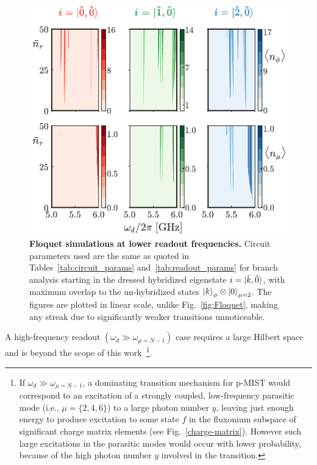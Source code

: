 \documentclass[%
reprint,
superscriptaddress,
 amsmath,amssymb,
 aps,
 prx,
longbibliography,
floatfix,
]{revtex4-2}
\newcommand{\AC}[1]{{\color{blue}{{}[AC: #1]}}}
\begin{document}
\begin{figure}[t]
    \centering
    \includegraphics[width=\linewidth]{Figures/Floquet_low.pdf}
    \caption{{\bf Floquet simulations at lower readout frequencies.} Circuit parameters used are the same as quoted in Tables~\ref{tab:circuit_params} and~\ref{tab:readout_params} for branch analysis starting in the dressed hybridized eigenstate $i=\ket{\tilde{k},\tilde{0}}$, with maximum overlap to the un-hybridized states $\ket{k}_\phi\otimes\ket{0}_{\mu=2}$. The figures are plotted in linear scale, unlike Fig.~\ref{fig:Floquet}, making any streak due to significantly weaker transitions unnoticeable.}
    \label{fig:Flo_low}
\end{figure}

A high-frequency readout $(\omega_d\gg \omega_{\mu=N-1})$ case requires a large Hilbert space and is beyond the scope of this work~\footnote{If  $\omega_d\gg \omega_{\mu=N-1}$, a dominating transition mechanism for p-MIST would correspond to an excitation of a strongly coupled, low-frequency parasitic mode (i.e., $\mu=\{2,4,6\}$) to a large photon number $y$, leaving just enough energy to produce excitation to some state $f$ in the fluxonium subspace of significant charge matrix elements (see Fig.~\ref{charge-matrix}). However such large excitations in the parasitic modes would occur with lower probability, because of the high photon number $y$ involved in the transition.}. 
\end{document}
